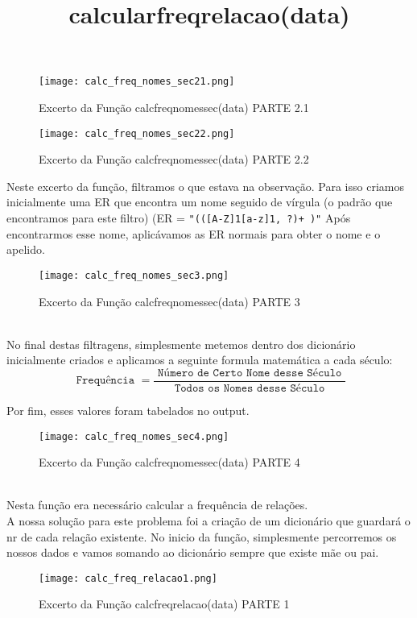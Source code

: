 \documentclass[11pt,a4paper]{report}%
\begin{document}
\begin{figure}[htbp]
\centerline{\texttt{[image: calc\_freq\_nomes\_sec21.png]}}
\caption{Excerto da Função calc\textunderscore freq\textunderscore nomes\textunderscore sec(data) PARTE 2.1}
\label{fig}
\end{figure}
\begin{figure}[htbp]
\centerline{\texttt{[image: calc\_freq\_nomes\_sec22.png]}}
\caption{Excerto da Função calc\textunderscore freq\textunderscore nomes\textunderscore sec(data) PARTE 2.2}
\label{fig}
\end{figure}

Neste excerto da função, filtramos o que estava na observação.
Para isso criamos inicialmente uma ER que encontra um nome seguido de vírgula (o padrão que encontramos para este filtro) (ER = \texttt{"(([A-Z]{1}[a-z]{1,} ?)+\,)"}
Após encontrarmos esse nome, aplicávamos as ER normais para obter o nome e o apelido.\\
\begin{figure}[htbp]
\centerline{\texttt{[image: calc\_freq\_nomes\_sec3.png]}}
\caption{Excerto da Função calc\textunderscore freq\textunderscore nomes\textunderscore sec(data) PARTE 3}
\label{fig}
\end{figure}
\\No final destas filtragens, simplesmente metemos dentro dos dicionário inicialmente criados e aplicamos a seguinte formula matemática a cada século:
$$
\texttt { Frequência }=\frac{\texttt { Número de Certo Nome desse Século }}{\texttt { Todos os Nomes desse Século }}
$$

Por fim, esses valores foram tabelados no output.

\begin{figure}[htbp]
\centerline{\texttt{[image: calc\_freq\_nomes\_sec4.png]}}
\caption{Excerto da Função calc\textunderscore freq\textunderscore nomes\textunderscore sec(data) PARTE 4}
\label{fig}
\end{figure}


\title{\textbf{calcular\textunderscore freq\textunderscore relacao(data)}}\\
Nesta função era necessário calcular a frequência de relações.\\
A nossa solução para este problema foi a criação de um dicionário que guardará o nr de cada relação existente.
No inicio da função, simplesmente percorremos os nossos dados e vamos somando ao dicionário sempre que existe mãe ou pai.\\

\begin{figure}[htbp]
\centerline{\texttt{[image: calc\_freq\_relacao1.png]}}
\caption{Excerto da Função calc\textunderscore freq\textunderscore relacao(data) PARTE 1}
\label{fig}
\end{figure}
\end{document}
